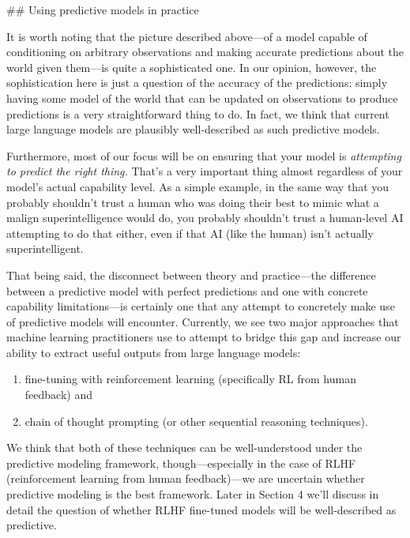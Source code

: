 {## Using predictive models in practice

It is worth noting that the picture described above---of a model capable of conditioning on arbitrary observations and making accurate predictions about the world given them---is quite a sophisticated one. In our opinion, however, the sophistication here is just a question of the accuracy of the predictions: simply having some model of the world that can be updated on observations to produce predictions is a very straightforward thing to do. In fact, we think that current large language models are plausibly well-described as such predictive models.

Furthermore, most of our focus will be on ensuring that your model is \textit{attempting to predict the right thing.} That's a very important thing almost regardless of your model's actual capability level. As a simple example, in the same way that you probably shouldn't trust a human who was doing their best to mimic what a malign superintelligence would do, you probably shouldn't trust a human-level AI attempting to do that either, even if that AI (like the human) isn't actually superintelligent.

That being said, the disconnect between theory and practice---the difference between a predictive model with perfect predictions and one with concrete capability limitations---is certainly one that any attempt to concretely make use of predictive models will encounter. Currently, we see two major approaches that machine learning practitioners use to attempt to bridge this gap and increase our ability to extract useful outputs from large language models:



\begin{enumerate}
\item fine-tuning with reinforcement learning\cite{TODO: cite https://arxiv.org/abs/1706.03741} (specifically RL from human feedback) and
\item chain of thought prompting\cite{TODO: cite https://arxiv.org/abs/2201.11903} (or other sequential reasoning techniques).
\end{enumerate}

We think that both of these techniques can be well-understood under the predictive modeling framework, though---especially in the case of RLHF (reinforcement learning from human feedback)---we are uncertain whether predictive modeling is the best framework. Later in Section 4\cite{TODO: cite TODO} we'll discuss in detail the question of whether RLHF fine-tuned models will be well-described as predictive.

}
